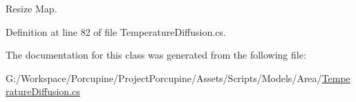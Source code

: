 Resize Map. 



Definition at line 82 of file Temperature\+Diffusion.\+cs.



The documentation for this class was generated from the following file\+:\begin{DoxyCompactItemize}
\item 
G\+:/\+Workspace/\+Porcupine/\+Project\+Porcupine/\+Assets/\+Scripts/\+Models/\+Area/\hyperlink{_temperature_diffusion_8cs}{Temperature\+Diffusion.\+cs}\end{DoxyCompactItemize}

